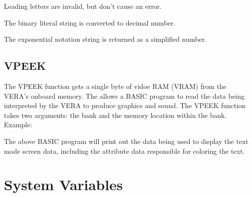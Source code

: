 Leading letters are invalid, but don't cause an error.\\


The binary literal string is converted to decimal number.\\


The exponential notation string is returned as a simplified number.\\


\subsection{VPEEK}

The {\ttfamily VPEEK} function gets a single byte of vidoe RAM (VRAM) from the
VERA's onboard memory.  The allows a BASIC program to read the data being
interpreted by the VERA to produce graphics and sound.  The {\ttfamily VPEEK}
function takes two arguments: the bank and the memory location within the bank.\\

Example:\\


The above BASIC program will print out the data being used to display the text
mode screen data, including the attribute data responsible for coloring the
text.\\

\section{System Variables}

